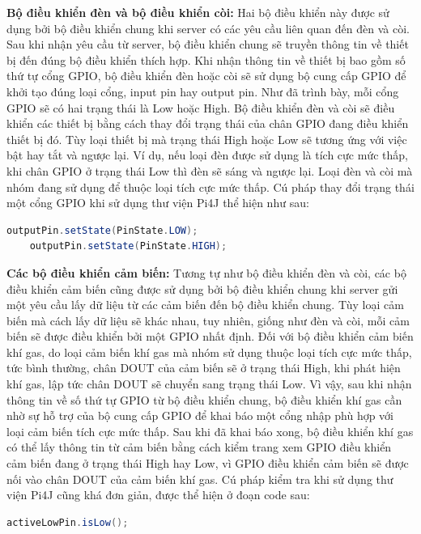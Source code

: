 \documentclass[12pt,a4paper,oneside]{extbook}
\begin{document}
\textbf{Bộ điều khiển đèn và bộ điều khiển còi:} Hai bộ điều khiển này được sử dụng bởi bộ điều khiển chung khi server có các yêu cầu liên quan đến đèn và còi. Sau khi nhận yêu cầu từ server, bộ điều khiển chung sẽ truyền thông tin về thiết bị đến đúng bộ điều khiển thích hợp. Khi nhận thông tin về thiết bị bao gồm số thứ tự cổng GPIO, bộ điều khiển đèn hoặc còi sẽ sử dụng bộ cung cấp GPIO để khởi tạo đúng loại cổng, input pin hay output pin.
Như đã trình bày, mỗi cổng GPIO sẽ có hai trạng thái là Low hoặc High. Bộ điều khiển đèn và còi sẽ điều khiển các thiết bị bằng cách thay đổi trạng thái của chân GPIO đang điều khiển thiết bị đó. Tùy loại thiết bị mà trạng thái High hoặc Low sẽ tương ứng với việc bật hay tắt và ngược lại. Ví dụ, nếu loại đèn được sử dụng là tích cực mức thấp, khi chân GPIO ở trạng thái Low thì đèn sẽ sáng và ngược lại. Loại đèn và còi mà nhóm đang sử dụng để thuộc loại tích cực mức thấp. Cú pháp thay đổi trạng thái một cổng GPIO khi sử dụng thư viện Pi4J thể hiện như sau:

\begin{lstlisting}[language=Java, label={lst:change-state-gpio}]
	outputPin.setState(PinState.LOW);
	outputPin.setState(PinState.HIGH);
\end{lstlisting}

\textbf{Các bộ điều khiển cảm biến:} Tương tự như bộ điều khiển đèn và còi, các bộ điều khiển cảm biến cũng được sử dụng bởi bộ điều khiển chung khi server gửi một yêu cầu lấy dữ liệu từ các cảm biến đến bộ điều khiển chung. Tùy loại cảm biến mà cách lấy dữ liệu sẽ khác nhau, tuy nhiên, giống như đèn và còi, mỗi cảm biến sẽ được điều khiển bởi một GPIO nhất định.
Đối với bộ điều khiển cảm biến khí gas, do loại cảm biến khí gas mà nhóm sử dụng thuộc loại tích cực mức thấp, tức bình thường, chân DOUT của cảm biến sẽ ở trạng thái High, khi phát hiện khí gas, lập tức chân DOUT sẽ chuyển sang trạng thái Low. Vì vậy, sau khi nhận thông tin về số thứ tự GPIO từ bộ điều khiển chung, bộ điều khiển khí gas cần nhờ sự hỗ trợ của bộ cung cấp GPIO để khai báo một cổng nhập phù hợp với loại cảm biến tích cực mức thấp. Sau khi đã khai báo xong, bộ điều khiển khí gas có thể lấy thông tin từ cảm biến bằng cách kiểm trang xem GPIO điều khiển cảm biến đang ở trạng thái High hay Low, vì GPIO điều khiển cảm biến sẽ được nối vào chân DOUT của cảm biến khí gas. Cú pháp kiểm tra khi sử dụng thư viện Pi4J cũng khá đơn giản, được thể hiện ở đoạn code sau:

\begin{lstlisting}[language=Java, label={lst:check-state-active-low}]
	activeLowPin.isLow();
\end{lstlisting}
\end{document}
